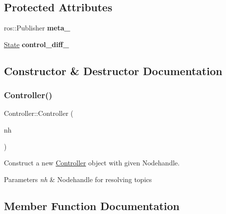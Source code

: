 \subsection*{Protected Attributes}
\begin{DoxyCompactItemize}
\item 
\mbox{\label{classController_aeb648bc7d97b36f1dcba956fa5aaeec6}} 
ros\+::\+Publisher {\bfseries meta\+\_\+}
\item 
\mbox{\label{classController_a454701a403066ee2b8c24bd61268655e}} 
\hyperlink{structController_1_1State}{State} {\bfseries control\+\_\+diff\+\_\+}
\end{DoxyCompactItemize}


\subsection{Constructor \& Destructor Documentation}
\mbox{\label{classController_a7341f9092e1977cdd2a1492c4422c019}} 
\subsubsection{\texorpdfstring{Controller()}{Controller()}}
{\footnotesize\ttfamily Controller\+::\+Controller (\begin{DoxyParamCaption}\item[{ros\+::\+Node\+Handle \&}]{nh }\end{DoxyParamCaption})}



Construct a new \hyperlink{classController}{Controller} object with given Nodehandle. 


\begin{DoxyParams}{Parameters}
{\em nh} & Nodehandle for resolving topics \\
\hline
\end{DoxyParams}


\subsection{Member Function Documentation}
\mbox{\label{classController_a190a3955517e39310a4b715a883cbe02}} 
